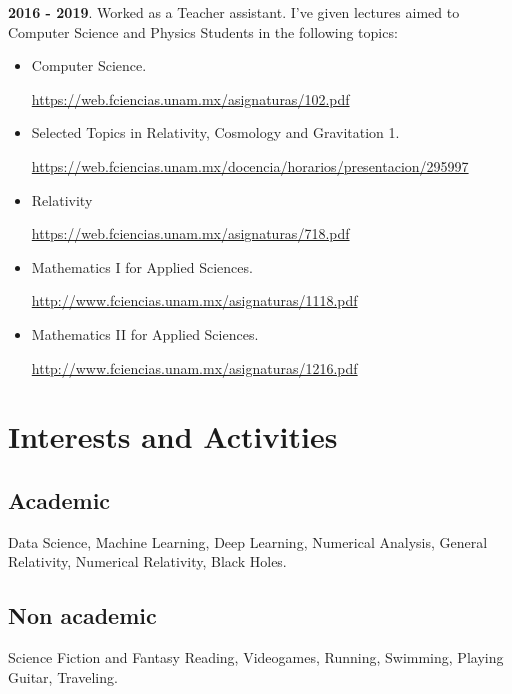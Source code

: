 \documentclass[a4paper,10pt]{article} %
\begin{document}
\textbf{2016 - 2019}. Worked as a Teacher assistant. I've given lectures aimed to Computer Science and Physics Students in the following topics:
\begin{itemize}
	\item Computer Science.
	
	\href{https://web.fciencias.unam.mx/asignaturas/102.pdf}{https://web.fciencias.unam.mx/asignaturas/102.pdf}
	
	\item Selected Topics in Relativity, Cosmology and Gravitation 1.
	
	\href{https://web.fciencias.unam.mx/docencia/horarios/presentacion/295997}{https://web.fciencias.unam.mx/docencia/horarios/presentacion/295997}
	
	\item Relativity
	
	\href{https://web.fciencias.unam.mx/asignaturas/718.pdf}{https://web.fciencias.unam.mx/asignaturas/718.pdf}
	
	\item Mathematics I for Applied Sciences. 
	
	\href{http://www.fciencias.unam.mx/asignaturas/1118.pdf}{http://www.fciencias.unam.mx/asignaturas/1118.pdf}
	
	\item Mathematics II for Applied Sciences.
	
	\href{http://www.fciencias.unam.mx/asignaturas/1216.pdf}{http://www.fciencias.unam.mx/asignaturas/1216.pdf}
\end{itemize}
\bigskip


\section{Interests and Activities}
\bigskip
\subsection*{Academic}
Data Science, Machine Learning, Deep Learning, Numerical Analysis, General Relativity, Numerical Relativity, Black Holes.
\subsection*{Non academic}
Science Fiction and Fantasy Reading, Videogames, Running, Swimming, Playing Guitar, Traveling. 
\bigskip
\end{document}
